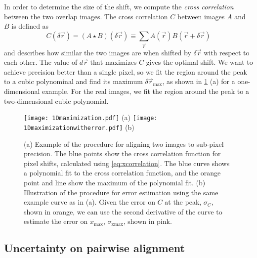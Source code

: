 \documentclass{article}
\begin{document}
In order to determine the size of the shift, we compute the \emph{cross correlation} between the two overlap images.  The cross correlation $C$ between images $A$ and $B$ is defined as
\begin{equation}
C(\delta\vec{r})=(A\star B)(\delta\vec{r})\equiv\sum_{\vec{r}} {A(\vec{r})B(\vec{r}+\delta\vec{r})}
\label{eq:xcorrelation}
\end{equation}
and describes how similar the two images are when shifted by $\delta\vec{r}$ with respect to each other.  The value of $d\vec{r}$ that maximizes $C$ gives the optimal shift.  We want to achieve precision better than a single pixel, so we fit the region around the peak to a cubic polynominal and find its maximum $\delta\vec{r}_\text{max}$, as shown in \cref{fig:1Dmaximization} (a) for a one-dimensional example.  For the real images, we fit the region around the peak to a two-dimensional cubic polynomial.

\begin{figure}[ht]
	\centering
	\begin{multicols}{2}
	\texttt{[image: 1Dmaximization.pdf]} (a)
	\texttt{[image: 1Dmaximizationwitherror.pdf]} (b)
	\end{multicols}
	\caption{(a) Example of the procedure for aligning two images to sub-pixel precision.  The blue points show the cross correlation function for pixel shifts, calculated using \cref{eq:xcorrelation}.  The blue curve shows a polynomial fit to the cross correlation function, and the orange point and line show the maximum of the polynomial fit. (b) Illustration of the procedure for error estimation using the same example curve as in (a).  Given the error on $C$ at the peak, $\sigma_C$, shown in orange, we can use the second derivative of the curve to estimate the error on $x_\text{max}$, $\sigma_\text{xmax}$, shown in pink.}
	\label{fig:1Dmaximization}
\end{figure}

\subsection{Uncertainty on pairwise alignment}
\end{document}
